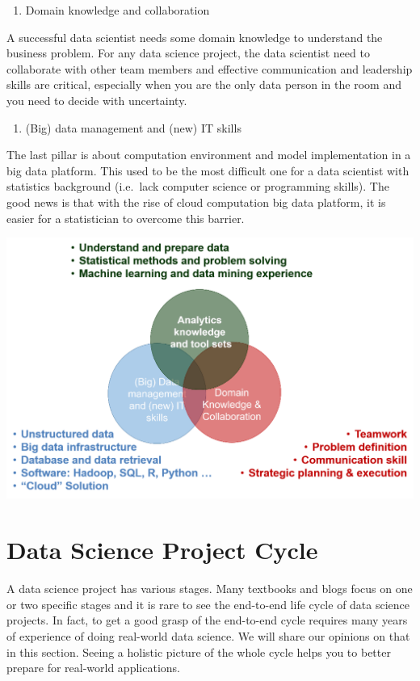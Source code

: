 \documentclass[12pt,]{krantz}
\providecommand{\tightlist}{%
  \setlength{\itemsep}{0pt}\setlength{\parskip}{0pt}}
\theoremstyle{definition}
\theoremstyle{definition}
\theoremstyle{definition}
\theoremstyle{remark}
\begin{document}
\begin{enumerate}
\def\labelenumi{(\arabic{enumi})}
\setcounter{enumi}{1}
\tightlist
\item
  Domain knowledge and collaboration
\end{enumerate}

A successful data scientist needs some domain knowledge to understand
the business problem. For any data science project, the data scientist
need to collaborate with other team members and effective communication
and leadership skills are critical, especially when you are the only
data person in the room and you need to decide with uncertainty.

\begin{enumerate}
\def\labelenumi{(\arabic{enumi})}
\setcounter{enumi}{2}
\tightlist
\item
  (Big) data management and (new) IT skills
\end{enumerate}

The last pillar is about computation environment and model
implementation in a big data platform. This used to be the most
difficult one for a data scientist with statistics background (i.e.~lack
computer science or programming skills). The good news is that with the
rise of cloud computation big data platform, it is easier for a
statistician to overcome this barrier.

\includegraphics{images/softskill2.png}

\section{Data Science Project Cycle}\label{data-science-project-cycle}

A data science project has various stages. Many textbooks and blogs
focus on one or two specific stages and it is rare to see the end-to-end
life cycle of data science projects. In fact, to get a good grasp of the
end-to-end cycle requires many years of experience of doing real-world
data science. We will share our opinions on that in this section. Seeing
a holistic picture of the whole cycle helps you to better prepare for
real-world applications.
\end{document}
